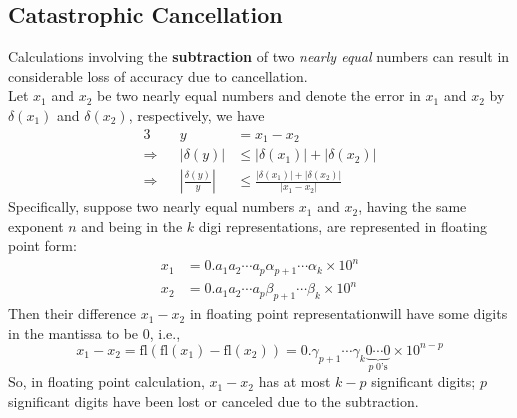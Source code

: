 \documentclass[12pt]{article}
\theoremstyle{definition}
\newcommand\fl[1]{\text{fl}\left(#1\right)}
\begin{document}
\subsection{Catastrophic Cancellation}
Calculations involving the \textbf{subtraction} of two \textit{nearly equal} numbers can result in considerable loss of accuracy due to cancellation.\\
Let $x_1$ and $x_2$ be two nearly equal numbers and denote the error in $x_1$ and $x_2$ by $\delta(x_1)$ and $\delta(x_2)$, respectively, we have
\begin{alignat*}{3}
&&y&=x_1-x_2\\
\Rightarrow&&|\delta(y)|&\leq |\delta(x_1)|+|\delta(x_2)|\\
\Rightarrow&&\left\lvert\frac{\delta(y)}{y}\right\lvert&\leq \frac{|\delta(x_1)|+|\delta(x_2)|}{|x_1-x_2|}
\end{alignat*}
Specifically, suppose two nearly equal numbers $x_1$ and $x_2$, having the same exponent $n$ and being in the $k$ digi representations, are represented in floating point form:
\begin{align*}
x_1&=0.a_1a_2\cdots a_p\alpha_{p+1}\cdots\alpha_{k}\times 10^n\\
x_2&=0.a_1a_2\cdots a_p\beta_{p+1}\cdots\beta_{k}\times 10^n
\end{align*}
Then their difference $x_1-x_2$ in floating point representationwill have some  digits in the mantissa to be $0$, i.e.,
\[
x_1 - x_2 = \fl{\fl{x_1}-\fl{x_2}}=0.\gamma_{p+1}\cdots\gamma_{k}\underbrace{0\cdots 0}_{p\;0\text{'s}}\times 10^{n-p}
\]
So, in floating point calculation, $x_1-x_2$ has at most $k-p$ significant digits; $p$ significant digits have been lost or canceled due to the subtraction.
\end{document}
